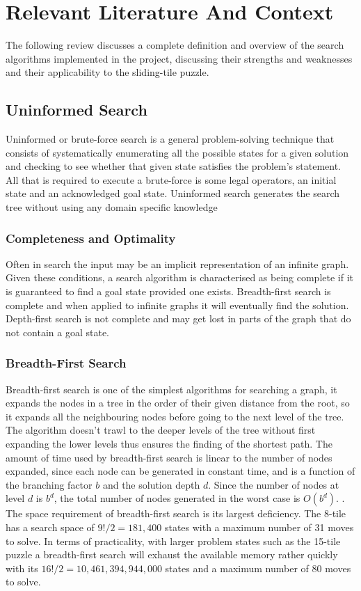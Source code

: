 \documentclass[final]{cmpreport}
\begin{document}
 
 

 


\section{Relevant Literature And Context}
The following review discusses a complete definition and overview of the search algorithms implemented in the project, discussing their strengths and weaknesses and their applicability to the sliding-tile puzzle. 
\subsection{Uninformed Search}
Uninformed or brute-force search is a general problem-solving technique that consists of systematically enumerating all the possible states for a given solution and checking to see whether that given state satisfies the problem's statement. All that is required to execute a brute-force is some legal operators, an initial state and an acknowledged goal state. Uninformed search generates the search tree without using any domain specific knowledge
\subsubsection{Completeness and Optimality}
 Often in search the input may be an implicit representation of an infinite graph. Given these conditions, a search algorithm is characterised as being complete if it is guaranteed to find a goal state provided one exists. Breadth-first search is complete and when applied to infinite graphs it will eventually find the solution. Depth-first search is not complete and may get lost in parts of the graph that do not contain a goal state.
\subsubsection{Breadth-First Search}
Breadth-first search is one of the simplest algorithms for searching a graph, it expands the nodes in a tree in the order of their given distance from the root, so it expands all the neighbouring nodes before going to the next level of the tree. The algorithm doesn't trawl to the deeper levels of the tree without first expanding the lower levels thus ensures the finding of the shortest path. The amount of time used by breadth-first search is linear to the number of nodes expanded, since each node can be generated in constant time, and is a function of the branching factor $b$ and the solution depth $d$. Since the number of nodes at level $d$ is $b^d$, the total number of nodes generated in the worst case is $O(b^d)$. \citep{DBLP:journals/mima/Korf95}. The space requirement of breadth-first search is its largest deficiency. The 8-tile has a search space of $9!/2=181,400$ states with a maximum number of 31 moves to solve. In terms of practicality, with larger problem states such as the 15-tile puzzle a breadth-first search will exhaust the available memory rather quickly with its $16!/2 = 10,461,394,944,000$ states and a maximum number of 80 moves to solve.
\end{document}
